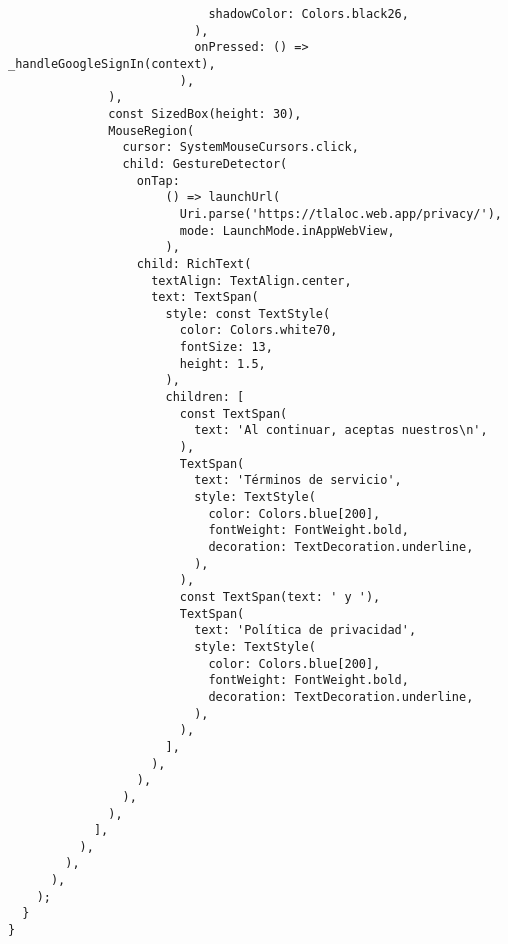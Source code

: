 \begin{verbatim}
                            shadowColor: Colors.black26,
                          ),
                          onPressed: () => _handleGoogleSignIn(context),
                        ),
              ),
              const SizedBox(height: 30),
              MouseRegion(
                cursor: SystemMouseCursors.click,
                child: GestureDetector(
                  onTap:
                      () => launchUrl(
                        Uri.parse('https://tlaloc.web.app/privacy/'),
                        mode: LaunchMode.inAppWebView,
                      ),
                  child: RichText(
                    textAlign: TextAlign.center,
                    text: TextSpan(
                      style: const TextStyle(
                        color: Colors.white70,
                        fontSize: 13,
                        height: 1.5,
                      ),
                      children: [
                        const TextSpan(
                          text: 'Al continuar, aceptas nuestros\n',
                        ),
                        TextSpan(
                          text: 'Términos de servicio',
                          style: TextStyle(
                            color: Colors.blue[200],
                            fontWeight: FontWeight.bold,
                            decoration: TextDecoration.underline,
                          ),
                        ),
                        const TextSpan(text: ' y '),
                        TextSpan(
                          text: 'Política de privacidad',
                          style: TextStyle(
                            color: Colors.blue[200],
                            fontWeight: FontWeight.bold,
                            decoration: TextDecoration.underline,
                          ),
                        ),
                      ],
                    ),
                  ),
                ),
              ),
            ],
          ),
        ),
      ),
    );
  }
}

\end{verbatim}






\newpage
